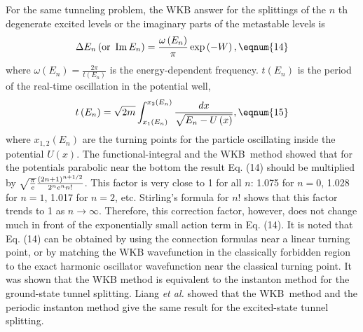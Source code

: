 For the same tunneling problem, the WKB answer for the splittings of the $n$%
th degenerate excited levels or the imaginary parts of the metastable levels
is\cite{26,24} 
\begin{equation}
\Delta E_n\left( \text{or }%
\mathop{\rm Im}%
E_n\right) =\frac{\omega \left( E_n\right) }\pi \exp \left( -W\right) , 
\eqnum{14}
\end{equation}
where $\omega \left( E_n\right) =\frac{2\pi }{t\left( E_n\right) }$ is the
energy-dependent frequency. $t\left( E_n\right) $ is the period of the
real-time oscillation in the potential well, 
\begin{equation}
t\left( E_n\right) =\sqrt{2m}\int_{x_1\left( E_n\right) }^{x_2\left(
E_n\right) }\frac{dx}{\sqrt{E_n-U\left( x\right) }},  \eqnum{15}
\end{equation}
where $x_{1,2}\left( E_n\right) $ are the turning points for the particle
oscillating inside the potential $U\left( x\right) $. The
functional-integral and the WKB\ method showed that for the potentials
parabolic near the bottom the result Eq. (14) should be multiplied by $\sqrt{%
\frac \pi e}\frac{\left( 2n+1\right) ^{n+1/2}}{2^ne^nn!}$.\cite{27} This
factor is very close to 1 for all $n$: 1.075 for $n=0$, 1.028 for $n=1$,
1.017 for $n=2$, etc. Stirling's formula for $n!$ shows that this factor
trends to 1 as $n\rightarrow \infty $. Therefore, this correction factor,
however, does not change much in front of the exponentially small action
term in Eq. (14). It is noted that Eq. (14) can be obtained by using the
connection formulas near a linear turning point,\cite{26} or by matching the
WKB wavefunction in the classically forbidden region to the exact harmonic
oscillator wavefunction near the classical turning point.\cite{24} It was
shown that the WKB method is equivalent to the instanton method for the
ground-state tunnel splitting.\cite{24} Liang {\it et al.} showed that the
WKB\ method and the periodic instanton method give the same result for the
excited-state tunnel splitting.\cite{25}

